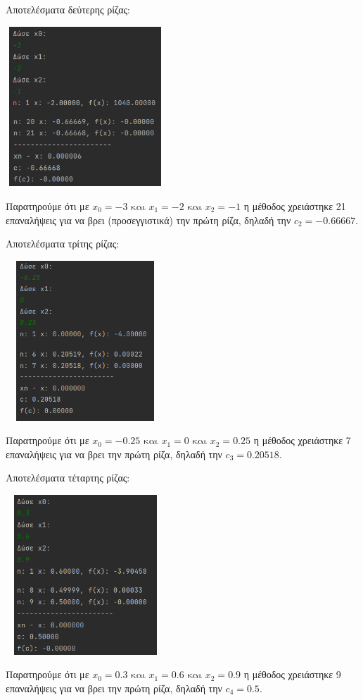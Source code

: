 \documentclass{article}
\begin{document}
    \vspace{3mm}
    Αποτελέσματα δεύτερης ρίζας: \\
    \begin{center}\includegraphics[width = 6cm, height = 6cm]{images/results_18.png}\end{center}
    Παρατηρούμε ότι με \(x_0 = -3 \text{ και } x_1 = -2 \text{ και } x_2 = -1\) η μέθοδος χρειάστηκε 21 επαναλήψεις για να βρει (προσεγγιστικά) την πρώτη ρίζα, δηλαδή την \(c_2 = -0.66667\).
    
    \pagebreak
    \vspace{3mm}
    Αποτελέσματα τρίτης ρίζας: \\
    \begin{center}\includegraphics[width = 6cm, height = 6cm]{images/results_19.png}\end{center}
    Παρατηρούμε ότι με \(x_0 = -0.25 \text{ και } x_1 = 0 \text{ και } x_2 = 0.25\) η μέθοδος χρειάστηκε 7 επαναλήψεις για να βρει την πρώτη ρίζα, δηλαδή την \(c_3 = 0.20518\).
    
    \vspace{3mm}
    Αποτελέσματα τέταρτης ρίζας: \\
    \begin{center}\includegraphics[width = 6cm, height = 6cm]{images/results_20.png}\end{center}
    Παρατηρούμε ότι με \(x_0 = 0.3 \text{ και } x_1 = 0.6 \text{ και } x_2 = 0.9\) η μέθοδος χρειάστηκε 9 επαναλήψεις για να βρει την πρώτη ρίζα, δηλαδή την \(c_4 = 0.5\).
    
\end{document}
